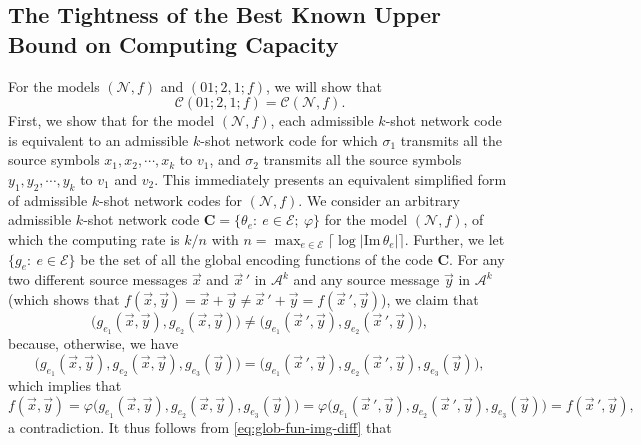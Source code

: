 \documentclass[11pt,draftclsnofoot,onecolumn]{IEEEtran}
\newcommand{\mE}{\mathcal{E}}
\newcommand{\mbC}{\mathbf{C}}
\def\Im{\mathrm{Im}}
\begin{document}
{\subsection{The Tightness of the Best Known Upper Bound on Computing Capacity}

For the models $(\mathcal{N},f)$ and $(01;2,1;f)$, we will show that
\begin{equation}
\mathcal{C}(01;2,1;f)=\mathcal{C}(\mathcal{N},f).\nonumber
\end{equation}
First, we show that  for the model $(\mathcal{N},f)$, each admissible $k$-shot network code is equivalent to an admissible $k$-shot network code for which $\sigma_1$ transmits all the source symbols $x_1,x_2,\cdots,x_k$ to
$v_1$, and $\sigma_2$ transmits all the source symbols $y_1,y_2,\cdots,y_k$ to $v_1$ and $v_2$.
This immediately presents an equivalent  simplified  form of  admissible $k$-shot network codes for $(\mathcal{N},f)$.
  We consider an arbitrary admissible $k$-shot network code $\mbC=\big\{\theta_{e}:~e\in \mE;~\varphi \big\}$ for the model $(\mathcal{N},f)$, of which the computing rate is $k/n$ with $n=\max_{e\in\mathcal{E}}\big\lceil\log|\Im\,\theta_{e}|\big\rceil$.
  Further, we let $\big\{g_{e}:~e\in\mathcal{E}\big\}$ be the set of all the global encoding functions of the  code  $\mbC$. For any two different source messages $\vec{x}$ and $\vec{x}\,'$ in $\mathcal{A}^k$ and any source message $\vec{y}$ in $\mathcal{A}^k$ (which shows that $f(\vec{x},\vec{y})=\vec{x}+\vec{y}\neq\vec{x}\,'+\vec{y}= f(\vec{x}\,',\vec{y})$), we claim that
  \begin{equation}
  \big(g_{e_1}(\vec{x},\vec{y}),g_{e_2}(\vec{x},\vec{y})\big)\neq  \big(g_{e_1}(\vec{x}\,',\vec{y}),g_{e_2}(\vec{x}\,',\vec{y})\big),\label{eq:glob-fun-img-diff}
  \end{equation}
  because, otherwise, we have
  \begin{equation}
  \big(g_{e_1}(\vec{x},\vec{y}),g_{e_2}(\vec{x},\vec{y}),g_{e_3}(\vec{y})\big)= \big(g_{e_1}(\vec{x}\,',\vec{y}),g_{e_2}(\vec{x}\,',\vec{y}),g_{e_3}(\vec{y})\big),\nonumber
  \end{equation}
  which implies that
   \begin{equation}
  f(\vec{x},\vec{y})=\varphi\big(g_{e_1}(\vec{x},\vec{y}),g_{e_2}(\vec{x},\vec{y}),g_{e_3}(\vec{y})\big)= \varphi \big(g_{e_1}(\vec{x}\,',\vec{y}),g_{e_2}(\vec{x}\,',\vec{y}),g_{e_3}(\vec{y})\big)=f(\vec{x}\,',\vec{y}),
  \nonumber
  \end{equation}
  a contradiction. It thus follows from \eqref{eq:glob-fun-img-diff} that
}
\end{document}
